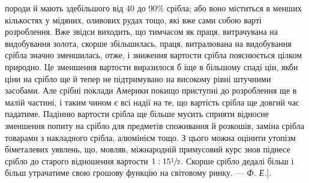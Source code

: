 {породи й мають здебільшого від 40 до 90\% срібла; або воно міститься
в менших кількостях у мідяних, оливових рудах тощо, які вже сами собою
варті розроблення. Вже звідси виходить, що тимчасом як праця,
витрачувана на видобування золота, скорше збільшилась, праця, витралювана
на видобування срібла значно зменшилась, отже, і зниження
вартости срібла пояснюється цілком природно. Це зменшення вартости
виразилося б іще в більшому спаді цін, якби ціни на срібло ще й тепер
не підтримувано на високому рівні штучними засобами. Але срібні поклади
Америки покищо приступні до розроблення ще в малій частині, і таким
чином є всі надії на те, що вартість срібла ще довгий час падатиме. Падінню
вартости срібла ще більше мусить сприяти відносне зменшення попиту
на срібло для предметів споживання й розкошів, заміна срібла товарами
з накладного срібла, алюмінієм тощо. З цього можна оцінити утопізм
біметалевих уявлень, що, мовляв, міжнародній примусовий курс
знов піднесе срібло до старого відношення вартости $1 : 15\sfrac{1}{2}$. Скорше
срібло дедалі більш і більш утрачатиме свою грошову функцію на світовому
ринку. —\emph{ Ф. Е.}].
}

